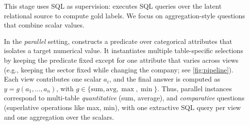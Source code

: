This stage uses SQL as supervision: \name executes SQL queries over the latent relational source to compute gold labels. We focus on aggregation-style questions that combine scalar values.


In the \emph{parallel} setting, \name constructs a predicate over categorical attributes that isolates a target numerical value. It instantiates multiple table-specific selections by keeping the predicate fixed except for one attribute that varies across views (e.g., keeping the sector fixed while changing the company; see \autoref{fig:pipeline}). %
Each view contributes one scalar $a_i$, and the final answer is computed as $y=g(a_1,\dots,a_n)$, with $g \in \{\mathrm{sum}, \mathrm{avg}, \max, \min\}$. Thus, parallel instances correspond to multi-table \emph{quantitative} (sum, average), and \emph{comparative} questions (superlative operations like max, min), with one extractive SQL query per view and one aggregation over the scalars.


